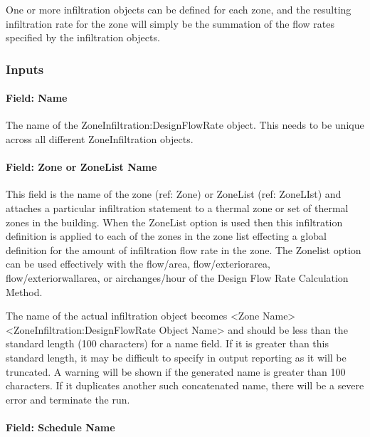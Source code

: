One or more infiltration objects can be defined for each zone, and the resulting infiltration rate for the zone will simply be the summation of the flow rates specified by the infiltration objects.

\subsubsection{Inputs}\label{inputs-005}

\paragraph{Field: Name}\label{field-name-005}

The name of the ZoneInfiltration:DesignFlowRate object. This needs to be unique across all different ZoneInfiltration objects.

\paragraph{Field: Zone or ZoneList Name}\label{field-zone-or-zonelist-name}

This field is the name of the zone (ref: Zone) or ZoneList (ref: ZoneLIst) and attaches a particular infiltration statement to a thermal zone or set of thermal zones in the building. When the ZoneList option is used then this infiltration definition is applied to each of the zones in the zone list effecting a global definition for the amount of infiltration flow rate in the zone. The Zonelist option can be used effectively with the flow/area, flow/exteriorarea, flow/exteriorwallarea, or airchanges/hour of the Design Flow Rate Calculation Method.

The name of the actual infiltration object becomes \textless{}Zone Name\textgreater{} \textless{}ZoneInfiltration:DesignFlowRate Object Name\textgreater{} and should be less than the standard length (100 characters) for a name field. If it is greater than this standard length, it may be difficult to specify in output reporting as it will be truncated. A warning will be shown if the generated name is greater than 100 characters. If it duplicates another such concatenated name, there will be a severe error and terminate the run.

\paragraph{Field: Schedule Name}\label{field-schedule-name-000}

